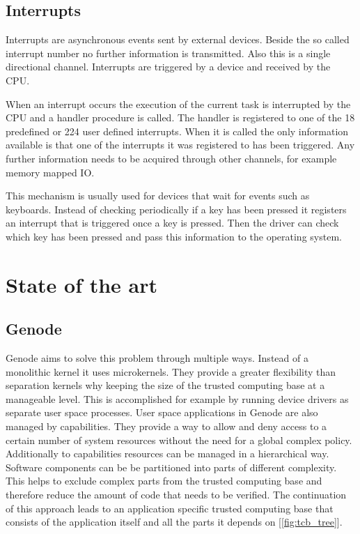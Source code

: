\documentclass[
a4paper,
12pt,
notitlepage,
parskip=half,
DIV=11,
]{scrbook}
\begin{document}
	\section{Interrupts}
	
	Interrupts are asynchronous events sent by external devices.
	Beside the so called interrupt number no further information is transmitted.
	Also this is a single directional channel.
	Interrupts are triggered by a device and received by the CPU.
	
	When an interrupt occurs the execution of the current task is interrupted by the CPU and a handler procedure is called.
	The handler is registered to one of the 18 predefined or 224 user defined interrupts.
	When it is called the only information available is that one of the interrupts it was registered to has been triggered.
	Any further information needs to be acquired through other channels, for example memory mapped IO. \citep{intelmanual}
	
	This mechanism is usually used for devices that wait for events such as keyboards.
	Instead of checking periodically if a key has been pressed it registers an interrupt that is triggered once a key is pressed.
	Then the driver can check which key has been pressed and pass this information to the operating system.
	
	\chapter{State of the art}
		
		\section{Genode}
		
		Genode aims to solve this problem through multiple ways.
		Instead of a monolithic kernel it uses microkernels.
		They provide a greater flexibility than separation kernels why keeping the size of the trusted computing base at a manageable level.
		This is accomplished for example by running device drivers as separate user space processes.
		User space applications in Genode are also managed by capabilities.
		They provide a way to allow and deny access to a certain number of system resources without the need for a global complex policy.
		Additionally to capabilities resources can be managed in a hierarchical way.
		Software components can be be partitioned into parts of different complexity.
		This helps to exclude complex parts from the trusted computing base and therefore reduce the amount of code that needs to be verified.
		The continuation of this approach leads to an application specific trusted computing base that consists of the application itself and all the parts it depends on [\ref{fig:tcb_tree}].
		\citep{genode}
		
\end{document}
